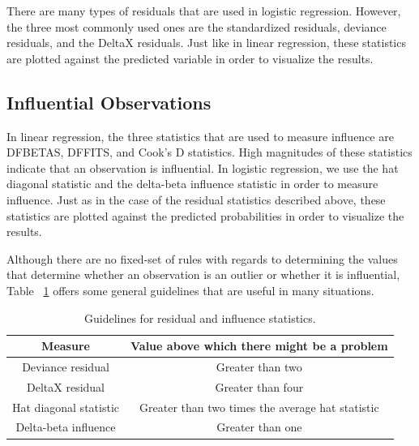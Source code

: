 \documentclass[a4paper,12pt,oneside]{book}
\begin{document}
There are many types of residuals that are used in logistic regression. However, the three most commonly used ones are the standardized residuals, deviance residuals, and the DeltaX residuals. Just like in linear 
regression, these statistics are plotted against the predicted variable in order to visualize the results.
\subsection{Influential Observations}
In linear regression, the three statistics that are used to measure influence are DFBETAS, DFFITS, and Cook’s D statistics. High magnitudes of these statistics indicate that an observation is influential. 
In logistic regression, we use the hat diagonal statistic and the delta-beta influence statistic in order to measure influence. Just as in the case of the residual statistics described above, these statistics are 
plotted against the predicted probabilities in order to visualize the results.

Although there are no fixed-set of rules with regards to determining the values that determine whether an observation is an outlier or whether it is influential, Table ~\ref{table:guidlines} offers some general guidelines that are 
useful in many situations.
\begin{table}[h!t]
	\caption{Guidelines for residual and influence statistics.} \label{table:guidlines}
	\centering
	\begin{tabular}{c c}
	\hline
	\bf Measure & \bf Value above which there might be a problem \\
	\hline
	Deviance residual & Greater than two \\
	DeltaX residual & Greater than four \\
	Hat diagonal statistic & Greater than two times the average hat statistic \\
	Delta-beta influence & Greater than one \\
	\hline
	\end{tabular}
\end{table}
\end{document}
